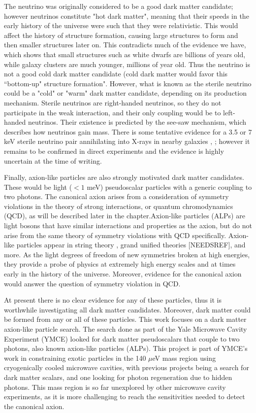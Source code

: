 \documentclass[12pt,twosides]{book}
\begin{document}
The neutrino was originally considered to be a good dark matter candidate; however neutrinos constitute "hot dark matter", meaning that their speeds in the early history of the universe were such that they were relativistic. This would affect the history of structure formation, causing large structures to form and then smaller structures later on. This contradicts much of the evidence we have, which shows that small structures such as white dwarfs are billions of years old, while galaxy clusters are much younger, millions of year old. Thus the neutrino is not a good cold dark matter candidate (cold dark matter would favor this ``bottom-up" structure formation". However, what is known as the sterile neutrino could be a "cold" or "warm" dark matter candidate, depending on its production mechanism. Sterile neutrinos are right-handed neutrinos, so they do not participate in the weak interaction, and their only coupling would be to left-handed neutrinos. Their existence is predicted by the see-saw mechanism, which describes how neutrinos gain mass. There is some tentative evidence for a 3.5 or 7 keV sterile neutrino pair annihilating into X-rays in nearby galaxies \cite{bulbul14}, \cite{boyarsky14}; however it remains to be confirmed in direct experiments and the evidence is highly uncertain at the time of writing.

Finally, axion-like particles are also strongly motivated dark matter candidates. These would be light ($< 1$ meV) pseudoscalar particles with a generic coupling to two photons. The canonical axion arises from a consideration of symmetry violations in the theory of strong interactions, or quantum chromodynamics (QCD), as will be described later in the chapter.Axion-like particles (ALPs) are light bosons that have similar interactions and properties as the axion, but do not arise from the same theory of symmetry violations with QCD specifically. Axion-like particles appear in string theory \cite{svrcek06}, grand unified theories [NEEDSREF], and more. As the light degrees of freedom of new symmetries broken at high energies, they provide a probe of physics at extremely high energy scales and at times early in the history of the universe. Moreover, evidence for the canonical axion would answer the question of symmetry violation in QCD.

At present there is no clear evidence for any of these particles, thus it is worthwhile investigating all dark matter candidates. Moreover, dark matter could be formed from any or all of these particles. This work focuses on a dark matter axion-like particle search.  The search done as part of the Yale Microwave Cavity Experiment (YMCE) looked for dark matter pseudoscalars that couple to two photons, also known axion-like particles (ALPs). This project is part of YMCE's work in constraining exotic particles in the 140 $\mu$eV mass region using cryogenically cooled microwave cavities, with previous projects being a search for dark matter scalars, and one looking for photon regeneration due to hidden photons. This mass region is so far unexplored by other microwave cavity experiments, as it is more challenging to reach the sensitivities needed to detect the canonical axion.
\end{document}
